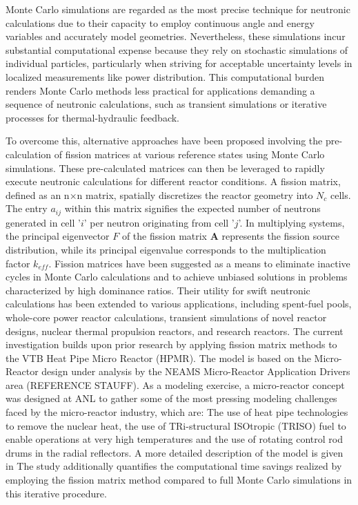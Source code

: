 
Monte Carlo simulations are regarded as the most precise technique for neutronic calculations due to their capacity to employ continuous angle and energy variables and accurately model geometries. Nevertheless, these simulations incur substantial computational expense because they rely on stochastic simulations of individual particles, particularly when striving for acceptable uncertainty levels in localized measurements like power distribution. This computational burden renders Monte Carlo methods less practical for applications demanding a sequence of neutronic calculations, such as transient simulations or iterative processes for thermal-hydraulic feedback.

To overcome this, alternative approaches have been proposed involving the pre-calculation of fission matrices at various reference states using Monte Carlo simulations. These pre-calculated matrices can then be leveraged to rapidly execute neutronic calculations for different reactor conditions. A fission matrix, defined as an n×n matrix, spatially discretizes the reactor geometry into $N_c$ cells. The entry $a_{ij}$ within this matrix signifies the expected number of neutrons generated in cell '$i$' per neutron originating from cell '$j$'. In multiplying systems, the principal eigenvector $F$ of the fission matrix $\textbf{A}$ represents the fission source distribution, while its principal eigenvalue corresponds to the multiplication factor $k_{eff}$.
Fission matrices have been suggested as a means to eliminate inactive cycles in Monte Carlo calculations and to achieve unbiased solutions in problems characterized by high dominance ratios. Their utility for swift neutronic calculations has been extended to various applications, including spent-fuel pools, whole-core power reactor calculations, transient simulations of novel reactor designs, nuclear thermal propulsion reactors, and research reactors. The current investigation builds upon prior research by applying fission matrix methods to the VTB Heat Pipe Micro Reactor (HPMR). The model is based on the Micro-Reactor design under analysis by the NEAMS Micro-Reactor Application Drivers area (REFERENCE STAUFF). As a modeling exercise, a micro-reactor concept was designed at ANL to gather some of the most pressing modeling challenges faced by the micro-reactor industry, which are:  The use of heat pipe technologies to remove the nuclear heat, the use of TRi-structural ISOtropic (TRISO) fuel to enable operations at very high temperatures and the use of rotating control rod drums in the radial reflectors. A more detailed description of the model is given in  The study additionally quantifies the computational time savings realized by employing the fission matrix method compared to full Monte Carlo simulations in this iterative procedure.
